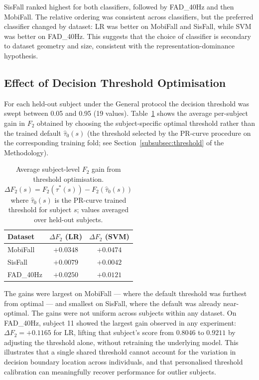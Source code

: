 \documentclass[onluarkali,ingilizce,yukseklisans,karton,LisansustuEgitim]{itutez}
\providecommand{\1}{\mathbf{1}}
\begin{document}
SisFall ranked highest for both classifiers, followed by FAD\_40Hz and then MobiFall. The relative ordering was consistent across classifiers, but the preferred classifier changed by dataset: LR was better on MobiFall and SisFall, while SVM was better on FAD\_40Hz. This suggests that the choice of classifier is secondary to dataset geometry and size, consistent with the representation-dominance hypothesis.


\subsection{Effect of Decision Threshold Optimisation}
\label{subsubsec:threshold_effect}

For each held-out subject under the General protocol the decision threshold was swept between 0.05 and 0.95 (19 values). Table~\ref{tab:threshold_gains} shows the average per-subject gain in $F_2$ obtained by choosing the subject-specific optimal threshold rather than the trained default $\hat\tau_0(s)$ (the threshold selected by the PR-curve procedure on the corresponding training fold; see Section~\ref{subsubsec:threshold} of the Methodology).

\begin{table}[h!]
\centering
\caption{Average subject-level $F_2$ gain from threshold optimisation.
  $\Delta F_2(s) = F_2(\tau^*(s)) - F_2(\hat\tau_0(s))$ where $\hat\tau_0(s)$ is the
  PR-curve trained threshold for subject $s$; values averaged over held-out subjects.}
\label{tab:threshold_gains}
\small
\begin{tabular}{lcc}
\toprule
\textbf{Dataset} & \textbf{$\Delta F_2$ (LR)} & \textbf{$\Delta F_2$ (SVM)} \\
\midrule
MobiFall   & $+0.0348$ & $+0.0474$ \\
SisFall    & $+0.0079$ & $+0.0042$ \\
FAD\_40Hz  & $+0.0250$ & $+0.0121$ \\
\bottomrule
\end{tabular}
\end{table}

The gains were largest on MobiFall --- where the default threshold was furthest from optimal --- and smallest on SisFall, where the default was already near-optimal. The gains were not uniform across subjects within any dataset. On FAD\_40Hz, subject 11 showed the largest gain observed in any experiment: $\Delta F_2 = +0.1165$ for LR, lifting that subject's score from $0.8046$ to $0.9211$ by adjusting the threshold alone, without retraining the underlying model. This illustrates that a single shared threshold cannot account for the variation in decision boundary location across individuals, and that personalised threshold calibration can meaningfully recover performance for outlier subjects.
\end{document}
